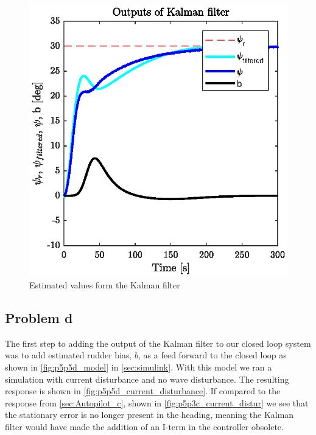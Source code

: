 \begin{figure}[h]
	\centering
	\includegraphics[width=\textwidth]{figures/p5p5c.eps}
	\caption{Estimated values form the Kalman filter}
\label{fig:p5p5c_Kalman_values}
\end{figure}

\subsection{Problem d}

The first step to adding the output of the Kalman filter to our closed loop system was to add estimated rudder bias, $b$, as a feed forward to the closed loop as shown in \cref{fig:p5p5d_model} in \cref{sec:simulink}. With this model we ran a simulation with current disturbance and no wave disturbance. The resulting response is shown in \cref{fig:p5p5d_current_disturbance}. If compared to the response from \cref{sec:Autopilot_c}, shown in \cref{fig:p5p3c_current_distur} we see that the stationary error is no longer present in the heading, meaning the Kalman filter would have made the addition of an I-term in the controller obsolete.

